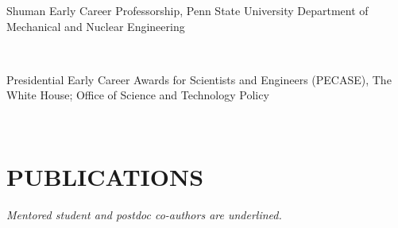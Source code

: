 \documentclass[a4paper,10pt]{article}
\begin{document}
        \noindent \parbox[t]{0.8\linewidth}{\raggedright Shuman Early Career Professorship, Penn State University Department of Mechanical and Nuclear Engineering} \hfill \parbox[t]{0.2\linewidth}{} \\
        
        \noindent \parbox[t]{0.8\linewidth}{\raggedright Presidential Early Career Awards for Scientists and Engineers (PECASE), The White House; Office of Science and Technology Policy} \hfill \parbox[t]{0.2\linewidth}{} \\
        

    \section*{PUBLICATIONS}
    \textit{Mentored student and postdoc co-authors are underlined.}
\end{document}
